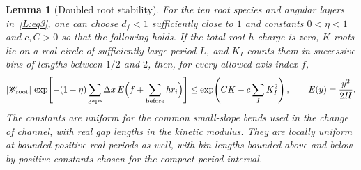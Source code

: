 \documentclass[11pt]{article}
\numberwithin{equation}{section}
\newtheorem{lemma}[theorem]{Lemma}
\theoremstyle{definition}\newtheorem{definition}[theorem]{Definition}
\theoremstyle{remark}\newtheorem{remark}[theorem]{Remark}
\begin{document}
\begin{lemma}[Doubled root stability]\label{L:lem:doubled-stability}
For the ten root species and angular layers in~\eqref{L:eq3}, one can
choose $d_f<1$ sufficiently close to $1$ and constants $0<\eta<1$ and $c,C>0$
so that the following holds. If the total root $h$-charge is zero,
$K$ roots lie on a real circle of sufficiently large period $L$, and
$K_I$ counts them in successive bins of lengths between $1/2$ and $2$,
then, for every allowed axis index $f$,
\[
 |\mathscr W_{\rm root}|\,
 \exp\!\left[-(1-\eta)\sum_{\rm gaps}
       \Delta x\,E\Bigl(f+\sum_{\rm before}hr_i\Bigr)\right]
 \le \exp\!\left(CK-c\sum_I K_I^2\right),
 \qquad E(y)=\frac{y^2}{2H}.
\]
The constants are uniform for the common small-slope bends used in the
change of channel, with real gap lengths in the kinetic modulus. They
are locally uniform at bounded positive real periods as well, with bin
lengths bounded above and below by positive constants chosen for the
compact period interval.
\end{lemma}
\end{document}
